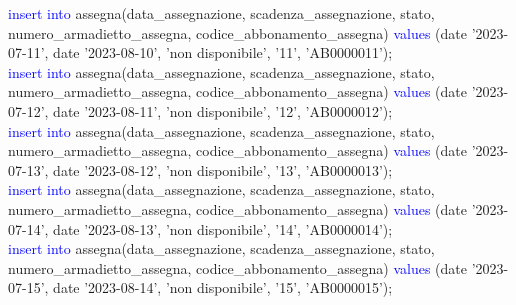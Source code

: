 \documentclass{article}
\begin{document}
\begin{flushleft}
{        \vspace{2mm}
        \hspace*{0.5em}\textcolor{blue}{insert into} assegna(data\_assegnazione, scadenza\_assegnazione, stato, \hspace*{0.5em}numero\_armadietto\_assegna, codice\_abbonamento\_assegna) \textcolor{blue}{values} \hspace*{0.5em}(date \hspace*{0.5em}'2023-07-11', date '2023-08-10', 'non disponibile', '11', 'AB0000011'); \\
        \vspace{2mm}
        \hspace*{0.5em}\textcolor{blue}{insert into} assegna(data\_assegnazione, scadenza\_assegnazione, stato, \hspace*{0.5em}numero\_armadietto\_assegna, codice\_abbonamento\_assegna) \textcolor{blue}{values} \hspace*{0.5em}(date \hspace*{0.5em}'2023-07-12', date '2023-08-11', 'non disponibile', '12', 'AB0000012'); \\
        \vspace{2mm}
        \hspace*{0.5em}\textcolor{blue}{insert into} assegna(data\_assegnazione, scadenza\_assegnazione, stato, \hspace*{0.5em}numero\_armadietto\_assegna, codice\_abbonamento\_assegna) \textcolor{blue}{values} \hspace*{0.5em}(date \hspace*{0.5em}'2023-07-13', date '2023-08-12', 'non disponibile', '13', 'AB0000013'); \\
        \vspace{2mm}
        \hspace*{0.5em}\textcolor{blue}{insert into} assegna(data\_assegnazione, scadenza\_assegnazione, stato, \hspace*{0.5em}numero\_armadietto\_assegna, codice\_abbonamento\_assegna) \textcolor{blue}{values} \hspace*{0.5em}(date \hspace*{0.5em}'2023-07-14', date '2023-08-13', 'non disponibile', '14', 'AB0000014'); \\
        \vspace{2mm}
        \hspace*{0.5em}\textcolor{blue}{insert into} assegna(data\_assegnazione, scadenza\_assegnazione, stato, \hspace*{0.5em}numero\_armadietto\_assegna, codice\_abbonamento\_assegna) \textcolor{blue}{values} \hspace*{0.5em}(date \hspace*{0.5em}'2023-07-15', date '2023-08-14', 'non disponibile', '15', 'AB0000015'); \\
}
\end{flushleft}
\end{document}
